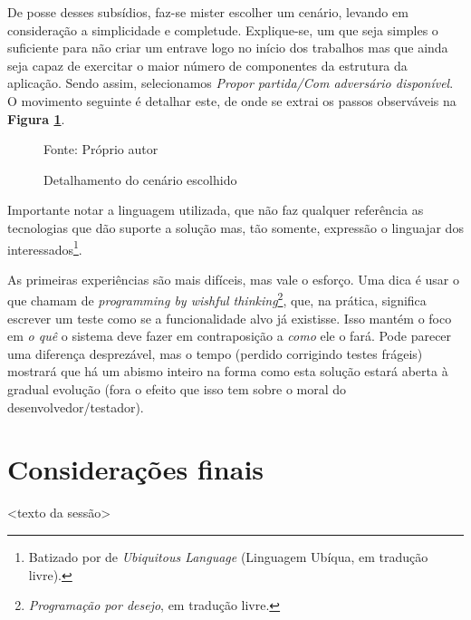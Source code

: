 \documentclass[12pt,a4paper,oneside,english,brazil]{article}
\begin{document}
      De posse desses subsídios, faz-se mister escolher um cenário, levando em
      consideração a simplicidade e completude. Explique-se, um que seja simples
      o suficiente para não criar um entrave logo no início dos trabalhos mas
      que ainda seja capaz de exercitar o maior número de componentes da
      estrutura da aplicação. Sendo assim, selecionamos
      \emph{Propor partida/Com adversário disponível}. O movimento seguinte é
      detalhar este, de onde se extrai os passos observáveis na \textbf{Figura
      \ref{fig:passos-primeiro-cenario-escolhido}}.

      \begin{figure}[h]
        \centering
        \caption{Detalhamento do cenário escolhido}
        
        Fonte: Próprio autor\footnotemark
        \label{fig:passos-primeiro-cenario-escolhido}
      \end{figure}

      Importante notar a linguagem utilizada, que não faz qualquer referência as
      tecnologias que dão suporte a solução mas, tão somente, expressão o
      linguajar dos interessados\footnote{Batizado por  de \emph{Ubiquitous Language} (Linguagem Ubíqua, em tradução
      livre).}.

      As primeiras experiências são mais difíceis, mas vale o esforço. Uma dica
      é usar o que  chamam de \emph{programming
      by wishful thinking}\footnote{\emph{Programação por desejo}, em tradução
      livre.}, que, na prática, significa escrever um teste como se a
      funcionalidade alvo já existisse. Isso mantém o foco em \emph{o quê} o
      sistema deve fazer em contraposição a \emph{como} ele o fará. Pode parecer
      uma diferença desprezável, mas o tempo (perdido corrigindo testes frágeis)
      mostrará que há um abismo inteiro na forma como esta solução estará aberta
      à gradual evolução (fora o efeito que isso tem sobre o moral do
      desenvolvedor/testador).

  \section{Considerações finais}

    <texto da sessão>

  \clearpage

  \renewcommand\refname{Referências Bibliográficas}

    
    
\end{document}
